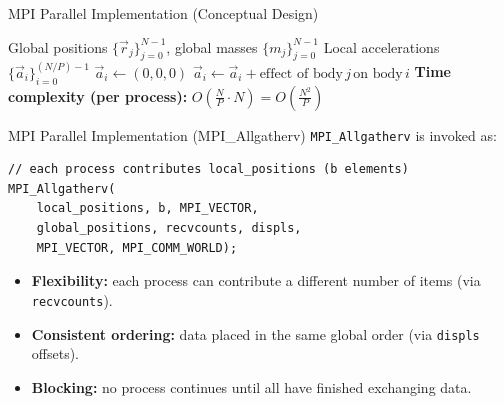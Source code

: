 \documentclass{beamer}
\begin{document}
\begin{frame}{MPI Parallel Implementation (Conceptual Design)}
\begin{algorithm}[H]
\caption{Parallel inner loop: compute local accelerations}
\label{alg:parallel_inner_loop}
\begin{algorithmic}[1]
\Require Global positions $\{\vec r_j\}_{j=0}^{N-1}$, global masses $\{m_j\}_{j=0}^{N-1}$
\Ensure Local accelerations $\{\vec a_i\}_{i=0}^{(N/P)-1}$
  \State $\vec a_i \gets (0,0,0)$
      \State $\vec a_i \gets \vec a_i + \text{effect of body}\, j \, \text{on body}\, i$
    \EndIf
  \EndFor
\EndFor
\Statex \textbf{Time complexity (per process):} $O\!\left(\frac{N}{P} \cdot N\right) = O\!\left(\frac{N^2}{P}\right)$
\end{algorithmic}
\end{algorithm}
\end{frame}

\begin{frame}[fragile]{MPI Parallel Implementation (MPI\_Allgatherv)}
\texttt{MPI\_Allgatherv} is invoked as:
\begin{lstlisting}[style=nbody]
// each process contributes local_positions (b elements)
MPI_Allgatherv(
    local_positions, b, MPI_VECTOR,
    global_positions, recvcounts, displs,
    MPI_VECTOR, MPI_COMM_WORLD);
\end{lstlisting}

\begin{itemize}
  \item \textbf{Flexibility:} each process can contribute a different number of items 
        (via \texttt{recvcounts}).
  \item \textbf{Consistent ordering:} data placed in the same global order 
        (via \texttt{displs} offsets).
  \item \textbf{Blocking:} no process continues until all have finished exchanging data.
\end{itemize}
\end{frame}
\end{document}
